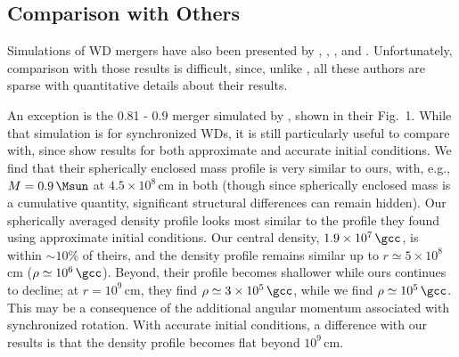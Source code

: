 
\subsection{Comparison with Others}
\label{ssec:compwithothers}

Simulations of WD mergers have also been presented by \citet{yoonpr07}, \citet{pakm+10,pakm+11,pakm+12}, \citet{dan+11,dan+12}, and \citet{rask+12}.  Unfortunately, comparison with those results is difficult, since, unlike \citeal{loreig09}, all these authors are sparse with quantitative details about their results.


An exception is the 0.81 - 0.9 {\Msun} merger simulated by \cite{dan+12}, shown in their Fig.~1.  While that simulation is for synchronized WDs, it is still particularly useful to compare with, since \citeauthor{dan+12} show results for both approximate and accurate initial conditions.  We find that their spherically enclosed mass profile is very similar to ours, with, e.g., $M=0.9\,\Msun$ at $4.5\times10^8\,$cm in both (though since spherically enclosed mass is a cumulative quantity, significant structural differences can remain hidden).  Our spherically averaged density profile looks most similar to the profile they found using approximate initial conditions.  Our central density, $1.9\times10^7\,\gcc$, is within $\sim\!10$\% of theirs, and the density profile remains similar up to $r \simeq 5 \times 10^8\,$cm ($\rho\simeq10^6\,\gcc$).  Beyond, their profile becomes shallower while ours continues to decline; at $r=10^9\,$cm, they find $\rho\simeq3\times10^5\,\gcc$, while we find $\rho\simeq10^5\,\gcc$.  This may be a consequence of the additional angular momentum associated with synchronized rotation.  With accurate initial conditions, a difference with our results is that the density profile becomes flat beyond $10^9\,$cm.  

